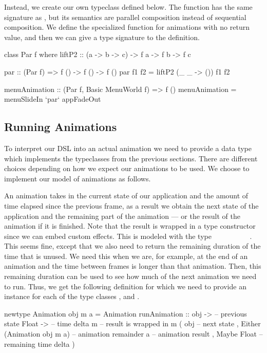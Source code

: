 Instead, we create our own  typeclass defined below. The function  has the same signature as , but its semantics are parallel composition instead of sequential composition. We define the specialized  function for animations with no return value, and then we can give a type signature to the  definition.

\begin{code}
class Par f where
  liftP2 :: (a -> b -> c) -> f a -> f b -> f c

par :: (Par f) => f () -> f () -> f ()
par f1 f2 = liftP2 (\_ _ -> ()) f1 f2

menuAnimation :: (Par f, Basic MenuWorld f) => f ()
menuAnimation = menuSlideIn `par` appFadeOut
\end{code}

\subsection{Running Animations}

To interpret our DSL into an actual animation we need to provide a data type which implements the typeclasses from the previous sections. There are different choices depending on how we expect our animations to be used. We choose to implement our model of animations as follows.

An animation takes in the current state of our application and the amount of time elapsed since the previous frame, as a result we obtain the next state of the application and the remaining part of the animation --- or the result of the animation if it is finished. Note that the result is wrapped in a type constructor  since we can embed custom effects. This is modeled with the type ~\hs{->}~~\hs{->}~~~~~~~. This seems fine, except that we also need to return the remaining duration of the time that is unused. We need this when we are, for example, at the end of an animation and the time between frames is longer than that animation. Then, this remaining duration can be used to see how much of the next animation we need to run. Thus, we get the following definition for which we need to provide an instance for each of the type classes ,  and .

\begin{code}
newtype Animation obj m a = Animation {
  runAnimation ::
    obj -> -- previous state
    Float -> -- time delta
    m -- result is wrapped in m
      ( obj -- next state
      , Either
          (Animation obj m a) -- animation remainder
          a -- animation result
      , Maybe Float -- remaining time delta
      )
}
\end{code}

